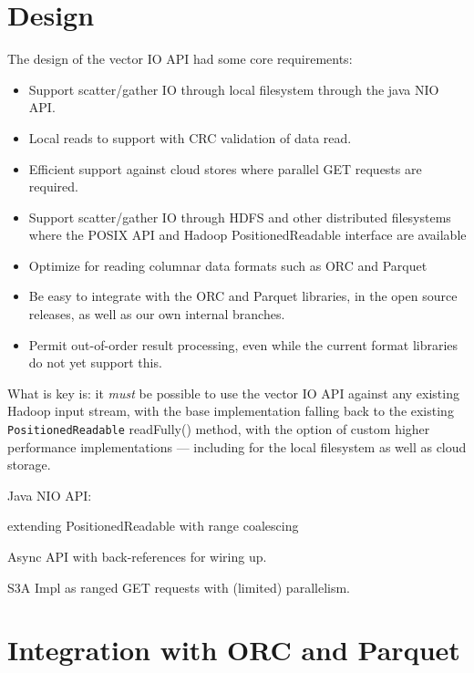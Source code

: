 \documentclass[manuscript]{acmart}
\begin{document}

\section{Design}
\label{sec:design}

The design of the vector IO API had some core requirements:
\begin{itemize}
  \item Support scatter/gather IO through local filesystem through the java NIO API.
  \item Local reads to support with CRC validation of data read.
  \item Efficient support against cloud stores where parallel GET requests are required.
  \item Support scatter/gather IO through HDFS and other distributed filesystems
        where the POSIX API and Hadoop PositionedReadable interface are available
  \item Optimize for reading columnar data formats such as ORC and Parquet
  \item Be easy to integrate with the ORC and Parquet libraries, in the open
        source releases, as well as our own internal branches.
  \item Permit out-of-order result processing, even while the current format libraries
        do not yet support this.
\end{itemize}

What is key is: it \emph{must} be possible to use the vector IO API against
any existing Hadoop input stream, with the base implementation
falling back to the existing \texttt{PositionedReadable} readFully() method,
with the option of custom higher performance implementations --- including
for the local filesystem as well as cloud storage.

Java NIO API:

extending PositionedReadable with range coalescing

Async API with back-references for wiring up.

S3A Impl as ranged GET requests with (limited) parallelism.


\section{Integration with ORC and Parquet}
\label{sec:integration}
\end{document}
